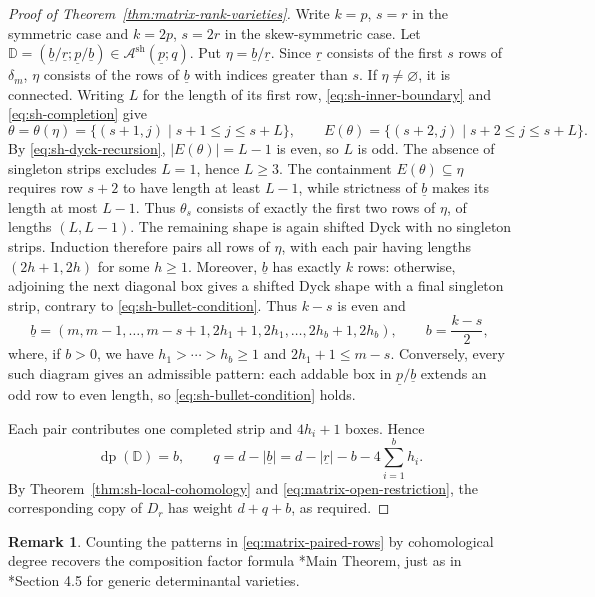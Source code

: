 \documentclass[12pt]{amsart}
\renewcommand{\b}{\underline{b}}
\newcommand{\DD}{\mathbb{D}}
\theoremstyle{definition}
\newtheorem{remark}[theorem]{Remark}
\numberwithin{equation}{section}
\begin{document}
\begin{proof}[Proof of Theorem~\ref{thm:matrix-rank-varieties}]
Write $k=p$, $s=r$ in the symmetric case and $k=2p$, $s=2r$
in the skew-symmetric case. Let
$\DD=(\b/\underline r;\underline p/\b)
\in\mathscr A^{\mathrm{sh}}(\underline p;q)$.
Put $\eta=\b/\underline r$. Since $\underline r$ consists
of the first $s$ rows of $\delta_m$, $\eta$ consists of
the rows of $\b$ with indices greater than $s$.
If $\eta\ne\varnothing$, it is connected. Writing $L$ for
the length of its first row, \eqref{eq:sh-inner-boundary}
and \eqref{eq:sh-completion} give
\[
\theta=\theta(\eta)
 =\{(s+1,j)\mid s+1\leq j\leq s+L\},
\qquad
E(\theta)
 =\{(s+2,j)\mid s+2\leq j\leq s+L\}.
\]
By \eqref{eq:sh-dyck-recursion}, $|E(\theta)|=L-1$ is
even, so $L$ is odd. The absence of singleton strips
excludes $L=1$, hence $L\geq3$.
The containment $E(\theta)\subseteq\eta$ requires row $s+2$ to have length at least $L-1$, while strictness
of $\b$ makes its length at most $L-1$.
Thus $\theta_s$ consists of exactly the first two rows
of $\eta$, of lengths $(L,L-1)$.
The remaining shape is again shifted Dyck with no
singleton strips. Induction therefore pairs all rows
of $\eta$, with each pair having lengths $(2h+1,2h)$
for some $h\geq1$.
Moreover, $\b$ has exactly $k$ rows: otherwise, adjoining
the next diagonal box gives a shifted Dyck shape with a
final singleton strip, contrary to
\eqref{eq:sh-bullet-condition}. Thus $k-s$ is even and
\begin{equation}\label{eq:matrix-paired-rows}
\b=(m,m-1,\ldots,m-s+1,
       2h_1+1,2h_1,\ldots,2h_b+1,2h_b),
\qquad b=\frac{k-s}{2},
\end{equation}
where, if $b>0$, we have $h_1>\cdots>h_b\geq1$ and
$2h_1+1\leq m-s$. Conversely, every such diagram gives
an admissible pattern: each addable box in
$\underline p/\b$ extends an odd row to even length,
so \eqref{eq:sh-bullet-condition} holds.

Each pair contributes one completed strip and $4h_i+1$
boxes. Hence
\begin{equation}\label{eq:matrix-pattern-statistics}
\operatorname{dp}(\DD)=b,\qquad
q=d-|\b|=d-|\underline r|-b-4\sum_{i=1}^b h_i.
\end{equation}
By Theorem~\ref{thm:sh-local-cohomology} and
\eqref{eq:matrix-open-restriction}, the corresponding copy
of $D_r$ has weight $d+q+b$, as required.
\end{proof}

\begin{remark}
Counting the patterns in \eqref{eq:matrix-paired-rows} by
cohomological degree recovers the composition factor
formula \cite{raicu2016local}*{Main Theorem}, just as in
\cite{schubertLC}*{Section 4.5} for generic determinantal
varieties.
\end{remark}
\end{document}

